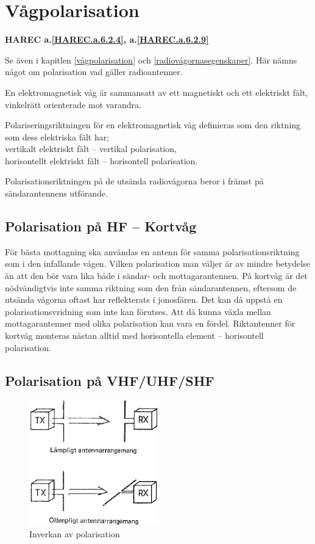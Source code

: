 \section{Vågpolarisation}
\textbf{
HAREC a.\ref{HAREC.a.6.2.4}\label{myHAREC.a.6.2.4}, a.\ref{HAREC.a.6.2.9}\label{myHAREC.a.6.2.9}
}

Se även i kapitlen \ref{vågpolarisation} och \ref{radiovågornasegenskaper}.
Här nämns något om polarisation vad gäller radioantenner.

En elektromagnetisk våg är sammansatt av ett magnetiskt och ett
elektriskt fält, vinkelrätt orienterade mot varandra.

Polariseringsriktningen för en elektromagnetisk våg definieras som den riktning
som dess elektriska fält har; \\
vertikalt elektriskt fält -- vertikal polarisation, \\
horisontellt elektriskt fält -- horisontell polarisation.

Polarisationsriktningen på de utsända radiovågorna beror i främst på
sändarantennens utförande.

\subsection{Polarisation på HF -- Kortvåg}
För bästa mottagning ska användas en antenn för samma
polarisationsriktning som i den infallande vågen. Vilken polarisation
man väljer är av mindre betydelse än att den bör vara lika både i
sändar- och mottagarantennen. På kortvåg är det nödvändigtvis inte
samma riktning som den från sändarantennen, eftersom de utsända
vågorna oftast har reflekterats i jonosfären. Det kan då uppstå en
polarisationsvridning som inte kan förutses. Att då kunna växla mellan
mottagarantenner med olika polarisation kan vara en
fördel. Riktantenner för kortvåg monteras nästan alltid med
horisontella element -- horisontell polarisation.

\subsection{Polarisation på VHF/UHF/SHF}

\begin{figure}
  \includegraphics[width=0.5\textwidth]{images/bild_2_6-11.png}
  \caption{Inverkan av polarisation}
  \label{fig:bildII6-11}
\end{figure}

